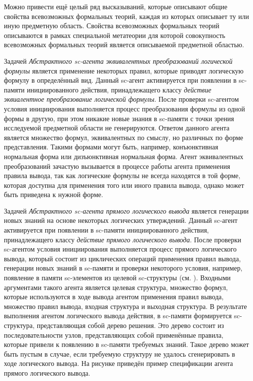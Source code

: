 Можно привести ещё целый ряд высказываний, которые описывают общие свойства всевозможных формальных теорий, каждая из которых описывает ту или иную предметную область. Свойства всевозможных формальных теорий описываются в рамках специальной метатеории для которой совокупность всевозможных формальных теорий является описываемой предметной областью.

Задачей \textit{Абстрактного sc-агента эквивалентных преобразований логической формулы} является применение некоторых правил, которые приводят логическую формулу в определённый вид. Данный sc-агент активируется при появлении в sc-памяти инициированного действия, принадлежащего классу \textit{действие эквиалентное преобразование логической формулы}. После проверки sc-агентом условия инициирования выполняется процесс преобразования формулы из одной формы в другую, при этом никакие новые знания в sc-памяти с точки зрения исследуемой предметной области не генерируются. Ответом данного агента является множество формул, эквивалентных по смыслу, но различных по форме представления. Такими формами могут быть, например, конъюнктивная нормальная форма или дизъюнктивная нормальная форма. Агент эквивалентных преобразований зачастую вызывается в процессе работы агента применения правила вывода, так как логические формулы не всегда находятся в той форме, которая доступна для применения того или иного правила вывода, однако может быть приведена к нужной форме.

Задачей \textit{Абстрактного sc-агента прямого логического вывода} является генерации новых знаний на основе некоторых логических утверждений. Данный sc-агент активируется при появлении в sc-памяти инициированного действия, принадлежащего классу \textit{действие прямого логического вывода}. После проверки sc-агентом условия инициирования выполняется процесс прямого логического вывода, который состоит из циклических операций применения правил вывода, генерации новых знаний в sc-памяти и проверки некоторого условия, например, появление в памяти sc-элементов из целевой sc-структуры (см. ). Входными аргументами такого агента является целевая структура, множество формул, которые используются в ходе вывода агентом применения правил вывода, множество правил вывода, входная структура и выходная структура. В результате выполнения агентом логического вывода действия, в sc-памяти формируется sc-структура, представляющая собой дерево решения. Это дерево состоит из последовательности узлов, представляющих собой применённые правила, которые привели к появлению в sc-памяти требуемых знаний. Такое дерево может быть пустым в случае, если требуемую структуру не удалось сгенерировать в ходе логического вывода. На рисунке \textit{} приведён пример спецификации агента прямого логического вывода.

